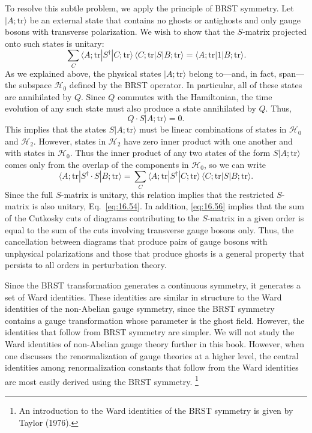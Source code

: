 To resolve this subtle problem, we apply the principle of BRST symmetry.
Let $|A;\mathrm{tr}\rangle$ be an external state that contains no ghosts or
antighosts and only gauge bosons with transverse polarization.  We wish to
show that the $S$-matrix projected onto such states is unitary:
\begin{equation}
  \sum_C \langle A;\mathrm{tr}|S^{\dagger}|C;\mathrm{tr}\rangle\,
    \langle C;\mathrm{tr}|S|B;\mathrm{tr}\rangle
  = \langle A;\mathrm{tr}|1|B;\mathrm{tr}\rangle .
  \label{eq:16.54}
\end{equation}
As we explained above, the physical states $|A;\mathrm{tr}\rangle$ belong
to---and, in fact, span---the subspace $\mathcal{H}_0$ defined by the BRST
operator.  In particular, all of these states are annihilated by $Q$.  Since
$Q$ commutes with the Hamiltonian, the time evolution of any such state must
also produce a state annihilated by $Q$.  Thus,
\begin{equation}
  Q\cdot S|A;\mathrm{tr}\rangle = 0 .
  \label{eq:16.55}
\end{equation}
This implies that the states $S|A;\mathrm{tr}\rangle$ must be linear
combinations of states in $\mathcal{H}_0$ and $\mathcal{H}_2$.  However,
states in $\mathcal{H}_2$ have zero inner product with one another and with
states in $\mathcal{H}_0$.  Thus the inner product of any two states of the
form $S|A;\mathrm{tr}\rangle$ comes only from the overlap of the components
in $\mathcal{H}_0$, so we can write
\begin{equation}
  \langle A;\mathrm{tr}|S^{\dagger}\cdot S|B;\mathrm{tr}\rangle
  = \sum_C \langle A;\mathrm{tr}|S^{\dagger}|C;\mathrm{tr}\rangle\,
    \langle C;\mathrm{tr}|S|B;\mathrm{tr}\rangle .
  \label{eq:16.56}
\end{equation}
Since the full $S$-matrix is unitary, this relation implies that the
restricted $S$-matrix is also unitary, Eq.~\eqref{eq:16.54}.  In addition,
\eqref{eq:16.56} implies that the sum of the Cutkosky cuts of diagrams
contributing to the $S$-matrix in a given order is equal to the sum of the
cuts involving transverse gauge bosons only.  Thus, the cancellation between
diagrams that produce pairs of gauge bosons with unphysical polarizations and
those that produce ghosts is a general property that persists to all orders
in perturbation theory.

Since the BRST transformation generates a continuous symmetry, it generates
a set of Ward identities.  These identities are similar in structure to the
Ward identities of the non-Abelian gauge symmetry, since the BRST symmetry
contains a gauge transformation whose parameter is the ghost field.  However,
the identities that follow from BRST symmetry are simpler.  We will not study
the Ward identities of non-Abelian gauge theory further in this book.
However, when one discusses the renormalization of gauge theories at a higher
level, the central identities among renormalization constants that follow
from the Ward identities are most easily derived using the BRST symmetry.%
\footnote{An introduction to the Ward identities of the BRST symmetry is
given by Taylor (1976).}


